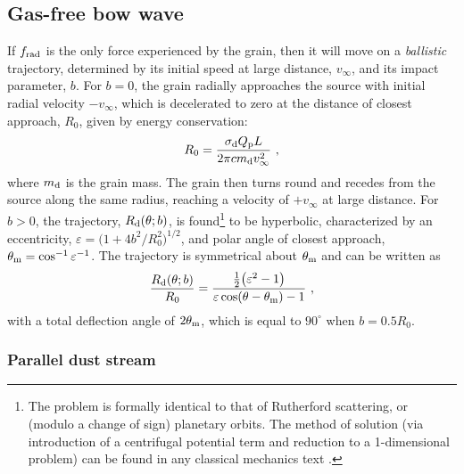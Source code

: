 \subsection{Gas-free bow wave}
\label{sec:gas-free-bow}


If \(f_{\text{rad}}\) is the only force experienced by the grain, then it will
move on a \textit{ballistic} trajectory, determined by its initial
speed at large distance, \(v_\infty\), and its impact parameter, \(b\).
For \(b = 0\), the grain radially approaches the source with initial
radial velocity \(-v_\infty\), which is decelerated to zero at the distance
of closest approach, \(R_0\), given by energy conservation:
\begin{equation}
  \label{eq:dust-r0}
  R_0 = \frac{\sigma_{\text{d}} Q_{\text{p}} L} {2 \pi c m_{\text{d}} v_\infty^2} \ ,
\end{equation}
where \(m_{\text{d}}\) is the grain mass.  The grain then turns round and
recedes from the source along the same radius, reaching a velocity of
\(+v_\infty\) at large distance.  For \(b > 0\), the trajectory,
\(R_{\text{d}}(\theta; b)\), is found\footnote{%
  The problem is formally identical to that of Rutherford scattering,
  or (modulo a change of sign) planetary orbits.  The method of
  solution (via introduction of a centrifugal potential term and
  reduction to a 1-dimensional problem) can be found in any classical
  mechanics text \citep[e.g.,][\S~14]{Landau:1976a}.} %
to be hyperbolic, characterized by an eccentricity,
\(\varepsilon = \bigl( 1 + 4 b^2 / R_0^2\bigr)^{1/2}\), and polar angle of
closest approach, \(\theta_{\text{m}} = \cos^{-1} \varepsilon^{-1}\).  The trajectory is
symmetrical about \(\theta_{\text{m}}\) and can be written as
\begin{equation}
  \label{eq:dust-r-theta}
  \frac{R_{\text{d}}(\theta; b)} {R_0} = 
  \frac{ \tfrac12 \bigl( \varepsilon^2 - 1 \bigr)} {\varepsilon \cos(\theta - \theta_{\text{m}}) - 1} \ , 
\end{equation}
with a total deflection angle of \(2 \theta_{\text{m}}\), which is equal to
\(90^\circ\) when \(b = 0.5 R_0\).

\subsubsection{Parallel dust stream}
\label{sec:dust-parallel}

